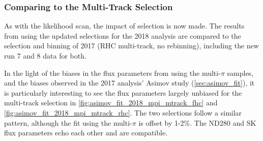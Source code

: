 \subsubsection{Comparing to the Multi-Track Selection}
As with the likelihood scan, the impact of selection is now made. The results from using the updated selections for the 2018 analysis are compared to the selection and binning of 2017 (RHC multi-track, no rebinning), including the new run 7 and 8 data for both.

In the light of the biases in the flux parameters from using the multi-$\pi$ samples, and the biases observed in the 2017 analysis' Asimov study (\autoref{sec:asimov_fit}), it is particularly interesting to see the flux parameters largely unbiased for the multi-track selection in \autoref{fig:asimov_fit_2018_mpi_mtrack_fhc} and \autoref{fig:asimov_fit_2018_mpi_mtrack_rhc}. The two selections follow a similar pattern, although the fit using the multi-$\pi$ is offset by 1-2\%. The ND280 and SK flux parameters echo each other and are compatible.

